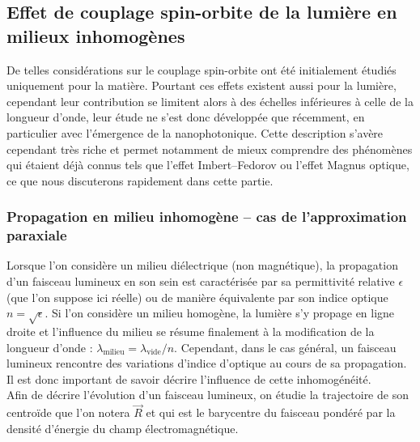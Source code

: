 \documentclass[a4paper,11pt]{article} %
\begin{document}
	\subsection{Effet de couplage spin-orbite de la lumière en milieux inhomogènes}
	De telles considérations sur le couplage spin-orbite ont été initialement étudiés uniquement pour la matière. Pourtant ces effets existent aussi pour la lumière, cependant leur contribution se limitent alors à des échelles inférieures à celle de la longueur d'onde, leur étude ne s'est donc développée que récemment, en particulier avec l'émergence de la nanophotonique. Cette description s'avère cependant très riche et permet notamment de mieux comprendre des phénomènes qui étaient déjà connus tels que l'effet Imbert--Fedorov ou l'effet Magnus optique, ce que nous discuterons rapidement dans cette partie.
	
	\subsubsection{Propagation en milieu inhomogène -- cas de l'approximation paraxiale}
	Lorsque l'on considère un milieu diélectrique (non magnétique), la propagation d'un faisceau lumineux en son sein est caractérisée par sa permittivité relative $ \epsilon $ (que l'on suppose ici réelle) ou de manière équivalente par son indice optique $ n = \sqrt{\epsilon} $. Si l'on considère un milieu homogène, la lumière s'y propage en ligne droite et l'influence du milieu se résume finalement à la modification de la longueur d'onde : $ \lambda_\text{milieu} = \lambda_\text{vide} / n $. Cependant, dans le cas général, un faisceau lumineux rencontre des variations d'indice d'optique au cours de sa propagation. Il est donc important de savoir décrire l'influence de cette inhomogénéité.\\
	Afin de décrire l'évolution d'un faisceau lumineux, on étudie la trajectoire de son centroïde que l'on notera $ \vec{R} $ et qui est le barycentre du faisceau pondéré par la densité d'énergie du champ électromagnétique.\\
	
\end{document}
